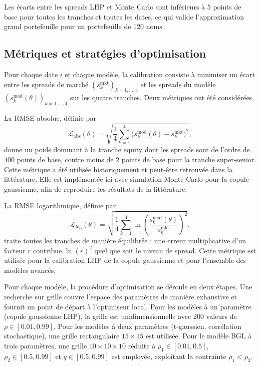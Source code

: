 Les écarts entre les spreads LHP et Monte Carlo sont inférieurs à 5 points de base pour
toutes les tranches et toutes les dates, ce qui valide l'approximation grand portefeuille pour
un portefeuille de 120 noms.

\subsection{Métriques et stratégies d'optimisation}

Pour chaque date $i$ et chaque modèle, la calibration consiste à minimiser un écart entre les
spreads de marché $(s_k^\text{mkt})_{k=1,\ldots,4}$ et les spreads du modèle $(s_k^\text{mod}(\theta))_{k=1,\ldots,4}$
sur les quatre tranches. Deux métriques ont été considérées.

\noindent La RMSE absolue, définie par
\begin{equation}
    \mathcal{L}_\text{abs}(\theta) = \sqrt{\frac{1}{4}\sum_{k=1}^{4}\bigl(s_k^\text{mod}(\theta) - s_k^\text{mkt}\bigr)^2},
\end{equation}
donne un poids dominant à la tranche equity dont les spreads sont de l'ordre de $400$ points
de base, contre moins de $2$ points de base pour la tranche super-senior. Cette métrique a été
utilisée historiquement et peut-être retrouvée dans la littérature. Elle est implémentée ici avec simulation Monte Carlo pour la copule
gaussienne, afin de reproduire les résultats de la littérature.

\noindent La RMSE logarithmique, définie par
\begin{equation}
    \mathcal{L}_\text{log}(\theta) = \sqrt{\frac{1}{4}\sum_{k=1}^{4}\ln\!\left(\frac{s_k^\text{mod}(\theta)}{s_k^\text{mkt}}\right)^2},
\end{equation}
traite toutes les tranches de manière équilibrée : une erreur multiplicative d'un facteur $r$
contribue $\ln(r)^2$ quel que soit le niveau de spread. Cette métrique est utilisée pour la
calibration LHP de la copule gaussienne et pour l'ensemble des modèles avancés.

Pour chaque modèle, la procédure d'optimisation se déroule en deux étapes. Une recherche
sur grille couvre l'espace des paramètres de manière exhaustive et fournit un point de départ
à l'optimiseur local. Pour les modèles à un paramètre (copule gaussienne LHP), la grille est
unidimensionnelle avec 200 valeurs de $\rho \in [0.01, 0.99]$. Pour les modèles à deux paramètres
(t-gaussien, corrélation stochastique), une grille rectangulaire $15 \times 15$ est utilisée.
Pour le modèle BGL à trois paramètres, une grille $10 \times 10 \times 10$ réduite à $\rho_1 \in [0.01, 0.5]$,
$\rho_2 \in [0.5, 0.99]$ et $q \in [0.5, 0.99]$ est employée, exploitant la contrainte $\rho_1 < \rho_2$.

